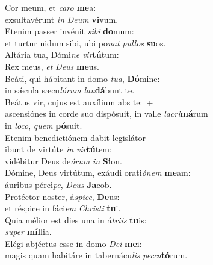 \evenverse Cor meum, et \textit{ca}\textit{ro} \textbf{me}a:~\*\\
\evenverse exsultavérunt \textit{in} \textit{De}\textit{um} \textbf{vi}vum.\\
\oddverse Etenim passer invénit \textit{si}\textit{bi} \textbf{do}mum:~\*\\
\oddverse et turtur nidum sibi, ubi po\textit{nat} \textit{pul}\textit{los} \textbf{su}os.\\
\evenverse Altária tua, Dómi\textit{ne} \textit{vir}\textbf{tú}tum:~\*\\
\evenverse Rex meus, \textit{et} \textit{De}\textit{us} \textbf{me}us.\\
\oddverse Beáti, qui hábitant in domo \textit{tu}\textit{a}, \textbf{Dó}mine:~\*\\
\oddverse in sǽcula sæcu\textit{ló}\textit{rum} \textit{lau}\textbf{dá}bunt te.\\
\evenverse Beátus vir, cujus est auxílium abs te:~+\\
\evenverse  ascensiónes in corde suo dispósuit, in valle \textit{la}\textit{cri}\textbf{má}rum~\*\\
\evenverse in \textit{lo}\textit{co}, \textit{quem} \textbf{pó}suit.\\
\oddverse Etenim benedictiónem dabit legislátor~+\\
\oddverse  ibunt de virtúte \textit{in} \textit{vir}\textbf{tú}tem:~\*\\
\oddverse vidébitur Deus de\textit{ó}\textit{rum} \textit{in} \textbf{Si}on.\\
\evenverse Dómine, Deus virtútum, exáudi orati\textit{ó}\textit{nem} \textbf{me}am:~\*\\
\evenverse áuribus pérci\textit{pe}, \textit{De}\textit{us} \textbf{Ja}cob.\\
\oddverse Protéctor noster, á\textit{spi}\textit{ce}, \textbf{De}us:~\*\\
\oddverse et réspice in fáci\textit{em} \textit{Chri}\textit{sti} \textbf{tu}i.\\
\evenverse Quia mélior est dies una in á\textit{tri}\textit{is} \textbf{tu}is:~\*\\
\evenverse \textit{su}\textit{per} \textbf{míl}lia.\\
\oddverse Elégi abjéctus esse in domo \textit{De}\textit{i} \textbf{me}i:~\*\\
\oddverse magis quam habitáre in tabernácu\textit{lis} \textit{pec}\textit{ca}\textbf{tó}rum.\\
